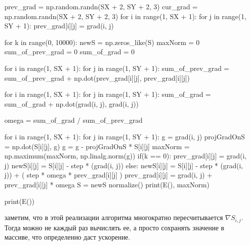 \documentclass[ 12pt,x11names]{article}
\begin{document}
\begin{python}
prev_grad =  np.random.randn(SX + 2, SY + 2, 3)
cur_grad = np.random.randn(SX + 2, SY + 2, 3)
for i in range(1, SX + 1):
    for j in range(1, SY + 1):
        prev_grad[i][j] = grad(i, j)

for k in range(0, 10000):
    newS = np.zeros_like(S)
    maxNorm = 0
    sum_of_prev_grad = 0
    sum_of_grad  =  0


    for i in range(1, SX + 1):
        for j in range(1, SY + 1):
            sum_of_prev_grad = sum_of_prev_grad +
            np.dot(prev_grad[i][j], prev_grad[i][j])

    for i in range(1, SX + 1):
        for j in range(1, SY + 1):
            sum_of_grad = sum_of_grad +
            np.dot(grad(i, j), grad(i, j))

    omega = sum_of_grad / sum_of_prev_grad

    for i in range(1, SX + 1):
        for j in range(1, SY + 1):
            g = grad(i,  j)
            projGradOnS = np.dot(S[i][j], g)
            g = g - projGradOnS * S[i][j]
            maxNorm = np.maximum(maxNorm, np.linalg.norm(g))
            if(k == 0):
                prev_grad[i][j] = grad(i, j)
                newS[i][j] = S[i][j] -
                step * (grad(i, j))
            else:
                newS[i][j] = S[i][j] - step * (grad(i, j))
                + ( step * omega *  prev_grad[i][j] )
                prev_grad[i][j] = grad(i, j) +
                prev_grad[i][j] * omega
    S = newS
    normalize()
    print(E(), maxNorm)

print(E())
 \end{python}
 заметим, что в этой реализации алгоритма многократно пересчитывается $\nabla S_{i, j}$. Тогда можно не каждый раз вычислять ее, а  просто сохранять значение в массиве, что определенно даст ускорение.
\end{document}
